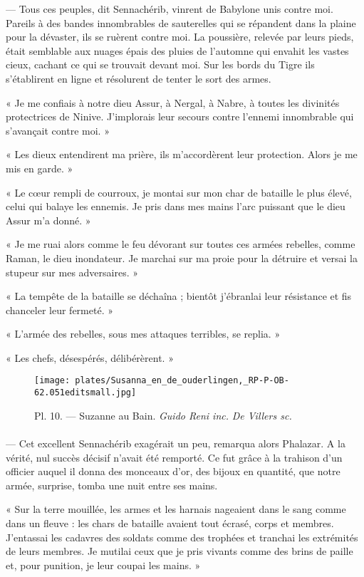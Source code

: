 \documentclass[a4paper, 11pt, oneside, polutonikogreek, french]{article}
\begin{document}
--- Tous ces peuples, dit Sennachérib, vinrent de Babylone unis contre moi. Pareils à des bandes innombrables de sauterelles qui se répandent dans la plaine pour la dévaster, ils se ruèrent contre moi. La poussière, relevée par leurs pieds, était semblable aux nuages épais des pluies de l'automne qui envahit les vastes cieux, cachant ce qui se trouvait devant moi. Sur les bords du Tigre ils s'établirent en ligne et résolurent de tenter le sort des armes.

« Je me confiais à notre dieu Assur, à Nergal, à Nabre, à toutes les divinités protectrices de Ninive. J'implorais leur secours contre l'ennemi innombrable qui s'avançait contre moi. »

« Les dieux entendirent ma prière, ils m'accordèrent leur protection. Alors je me mis en garde. »

« Le cœur rempli de courroux, je montai sur mon char de bataille le plus élevé, celui qui balaye les ennemis. Je pris dans mes mains l'arc puissant que le dieu Assur m'a donné. »

« Je me ruai alors comme le feu dévorant sur toutes ces armées rebelles, comme Raman, le dieu inondateur. Je marchai sur ma proie pour la détruire et versai la stupeur sur mes adversaires. »

« La tempête de la bataille se déchaîna ; bientôt j'ébranlai leur résistance et fis chanceler leur fermeté. »

« L'armée des rebelles, sous mes attaques terribles, se replia. »

« Les chefs, désespérés, délibérèrent. »
\clearpage
\begin{landscape}
\begin{figure}[H]
\centering
\texttt{[image: plates/Susanna\_en\_de\_ouderlingen,\_RP-P-OB-62.051editsmall.jpg]}
\caption{\Fontauri Pl. 10. --- Suzanne au Bain. \emph{Guido Reni inc.} \emph{De Villers sc.}}
\end{figure}
\end{landscape}
\clearpage
\paragraph{}
--- Cet excellent Sennachérib exagérait un peu, remarqua alors Phalazar. A la vérité, nul succès décisif n'avait été remporté. Ce fut grâce à la trahison d'un officier auquel il donna des monceaux d'or, des bijoux en quantité, que notre armée, surprise, tomba une nuit entre ses mains.

« Sur la terre mouillée, les armes et les harnais nageaient dans le sang comme dans un fleuve : les chars de bataille avaient tout écrasé, corps et membres. J'entassai les cadavres des soldats comme des trophées et tranchai les extrémités de leurs membres. Je mutilai ceux que je pris vivants comme des brins de paille et, pour punition, je leur coupai les mains. »
\end{document}
